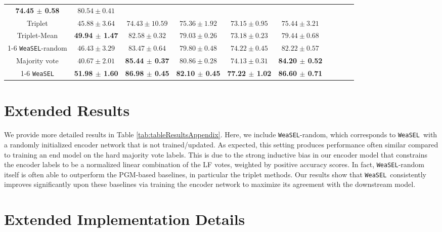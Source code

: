 \documentclass{article}
\newcommand{\weasel}{\texttt{WeaSEL}}\newcommand{\brackets}[1]{\left( #1 \right)}
\newcommand{\first}[1]{{\color{blue}\textbf{#1}}}
\newcommand{\second}[1]{{\textbf{#1}}}
\begin{document}
\begin{table*}[h!]
{\begin{tabular}{c|ccccccccc|}
            \second{74.45 $\pm$ 0.58} &
            $80.54 \pm 0.41$ \\Triplet &
            $45.88 \pm 3.64$ &
            $74.43 \pm 10.59$ & 
            $75.36 \pm 1.92$ &
            $73.15 \pm 0.95$ &
            $75.44 \pm 3.21$ \\Triplet-Mean &    
            \second{49.94 $\pm$ 1.47} &
            $82.58 \pm 0.32$ &
            $79.03 \pm 0.26$ &
            $73.18 \pm 0.23$ &
            $79.44 \pm 0.68$ \\\cline{1-6}
\weasel-random &
            $46.43 \pm 3.29$ &
            $83.47 \pm 0.64$ &
            $79.80 \pm 0.48$ &
            $74.22 \pm 0.45$ &
            $82.22 \pm 0.57$ \\Majority vote &
            $40.67 \pm 2.01$ &
            \second{85.44 $\pm$ 0.37} &
            $80.86 \pm 0.28$ &
            $74.13 \pm 0.31$ &
            \second{84.20 $\pm$ 0.52} \\\cline{1-6}
        \weasel  & 
            \first{51.98 $\pm$ 1.60} &
            \first{86.98 $\pm$ 0.45} &
            \second{82.10 $\pm$ 0.45} &
            \first{77.22 $\pm$ 1.02} &
            \first{86.60 $\pm$ 0.71}\\ \bottomrule
    \end{tabular}
    \label{tab:tableResultsAppendix}
}
\end{table*}
 \section{Extended Results} \label{sec:resultsAppendix}
We provide more detailed results in Table \ref{tab:tableResultsAppendix}.
Here, we include \weasel-random, which corresponds to \weasel\ with a randomly initialized encoder network that is not trained/updated. As expected, this setting produces performance often similar compared to training an end model on the hard majority vote labels. This is due to the strong inductive bias in our encoder model that constrains the encoder labels to be a normalized linear combination of the LF votes, weighted by positive accuracy scores.
In fact, \weasel-random itself is often able to outperform the PGM-based baselines, in particular the triplet methods.
Our results show that \weasel\ consistently improves significantly upon these baselines via training the encoder network to maximize its agreement with the downstream model.


\section{Extended Implementation Details}
\label{sec:implDetails}
\end{document}
